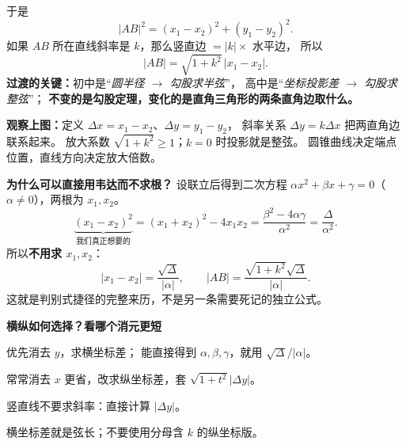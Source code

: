 \begin{explanationbox}
\begin{center}
\end{center}

于是
\[
 |AB|^2=(x_1-x_2)^2+(y_1-y_2)^2.
\]
如果 $AB$ 所在直线斜率是 $k$，那么竖直边 $=|k|\times$ 水平边，
所以
\[
 \boxed{|AB|=\sqrt{1+k^2}\,|x_1-x_2|.}
\]
\textbf{过渡的关键：}初中是“\emph{圆半径 $\rightarrow$ 勾股求半弦}”，
高中是“\emph{坐标投影差 $\rightarrow$ 勾股求整弦}”；
\textbf{不变的是勾股定理，变化的是直角三角形的两条直角边取什么。}

\medskip
\textbf{观察上图：}定义 $\Delta x=x_1-x_2$、$\Delta y=y_1-y_2$，
斜率关系 $\Delta y=k\Delta x$ 把两直角边联系起来。
放大系数 $\sqrt{1+k^2}\ge1$；$k=0$ 时投影就是整弦。
圆锥曲线决定端点位置，直线方向决定放大倍数。

\medskip
\textbf{\textcolor{CExplanation}{为什么可以直接用韦达而不求根？}}
设联立后得到二次方程
$\alpha x^2+\beta x+\gamma=0$（$\alpha\neq0$），两根为 $x_1,x_2$。
\[
 \underbrace{(x_1-x_2)^2}_{\text{我们真正想要的}}
 =(x_1+x_2)^2-4x_1x_2
 =\frac{\beta^2-4\alpha\gamma}{\alpha^2}
 =\frac{\Delta}{\alpha^2}.
\]
所以\textbf{不用求 $x_1,x_2$}：
\[
 \boxed{|x_1-x_2|=\frac{\sqrt\Delta}{|\alpha|}},\qquad
 \boxed{|AB|=\frac{\sqrt{1+k^2}\sqrt\Delta}{|\alpha|}}.
\]
这就是判别式捷径的完整来历，不是另一条需要死记的独立公式。

\medskip
\textbf{\textcolor{CExplanation}{横纵如何选择？看哪个消元更短}}
\begin{description}[style=nextline,leftmargin=2.8em,itemsep=0.35em]
 \item[\textbf{看到 $y=kx+b$}] 优先消去 $y$，求横坐标差；
 能直接得到 $\alpha,\beta,\gamma$，就用 $\sqrt\Delta/|\alpha|$。
 \item[\textbf{看到 $y^2=2px$ 或 $x=ty+d$}] 常常消去 $x$ 更省，改求纵坐标差，套 $\sqrt{1+t^2}|\Delta y|$。
 \item[\textbf{看到 $x=c$}] 竖直线不要求斜率：直接计算 $|\Delta y|$。
 \item[\textbf{看到 $k=0$}] 横坐标差就是弦长；不要使用分母含 $k$ 的纵坐标版。
\end{description}


\end{explanationbox}
